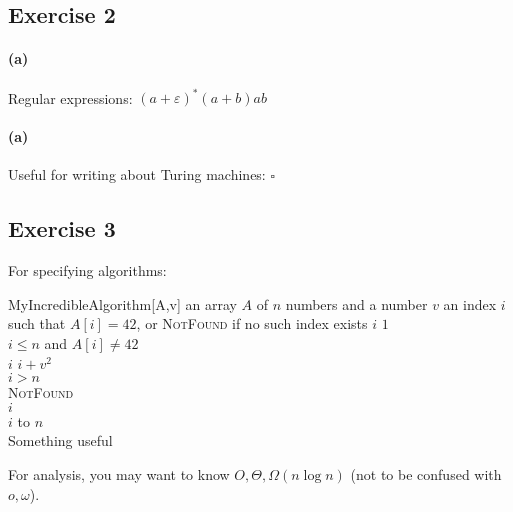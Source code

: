 \documentclass[a4paper,twoside,11pt]{article}
\begin{document}
\subsection*{Exercise 2}

\paragraph{(a)} Regular expressions: $(a + \varepsilon)^* (a+b) ab$
\paragraph{(a)} Useful for writing about Turing machines: $\square$

\subsection*{Exercise 3}

For specifying algorithms:

\begin{algorithm}{\sc MyIncredibleAlgorithm}[A,v]{
    \qinput an array $A$ of $n$ numbers and a number $v$
    \qoutput an index $i$ such that $A[i] = 42$, or \textsc{NotFound} if no such index exists}
    $i$ \qlet $1$ \\
    \qwhile $i \leq n$ and $A[i] \neq 42$ \\
     \qdo $i$ \qlet $i + v^2$ \qend \\
    \qif $i > n$ \\
    \qthen \qreturn \textsc{NotFound}\\
    \qelse \qreturn $i$ \qfi\\
    \qfor $i$  to $n$ \\
    \qdo Something useful \qend
\end{algorithm}

For analysis, you may want to know $O, \Theta, \Omega(n \log n)$ (not to be confused with $o, \omega$).
\end{document}
